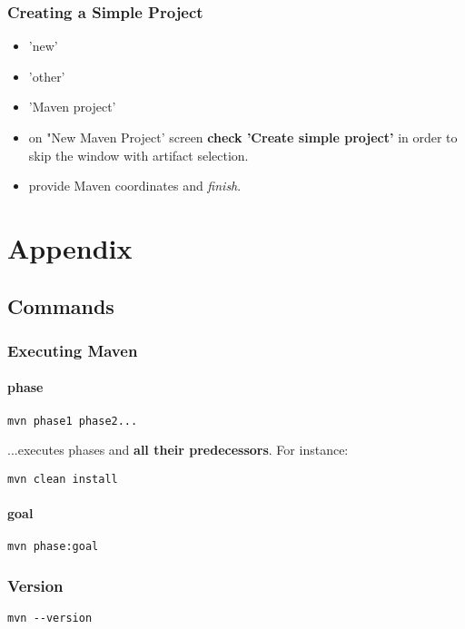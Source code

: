 \documentclass{report}
\begin{document}
\section{Creating a Simple Project}
\begin{itemize}
	\item 'new'
	\item 'other'
	\item 'Maven project'
	\item on "New Maven Project' screen \textbf{check 'Create simple project'} in order to skip the window with artifact selection.
	\item provide Maven coordinates and \textit{finish}.
\end{itemize}





\part{Appendix}



\chapter{Commands}


\section{Executing Maven}

\subsection{phase}
\begin{verbatim}
mvn phase1 phase2...
\end{verbatim}
...executes phases and \textbf{all their predecessors}. For instance:
\begin{verbatim}
mvn clean install
\end{verbatim}

\subsection{goal}
\begin{verbatim}
mvn phase:goal
\end{verbatim}


\section{Version}
\begin{verbatim}
mvn --version
\end{verbatim}
\end{document}
